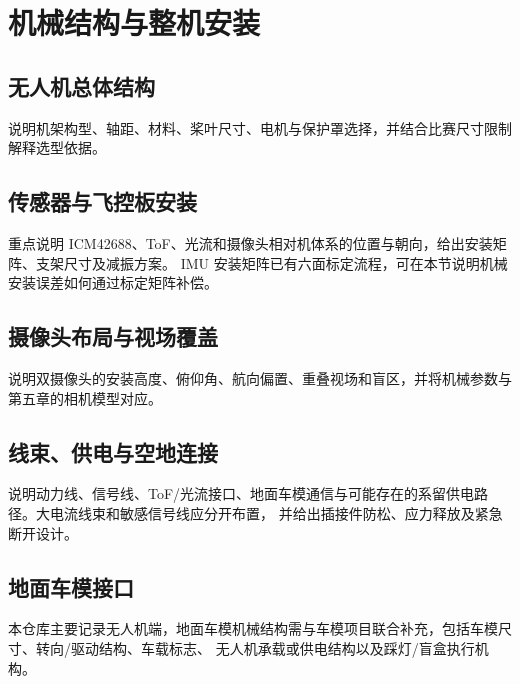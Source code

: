 \chapter{机械结构与整机安装}

\section{无人机总体结构}

说明机架构型、轴距、材料、桨叶尺寸、电机与保护罩选择，并结合比赛尺寸限制解释选型依据。



\section{传感器与飞控板安装}

重点说明 ICM42688、ToF、光流和摄像头相对机体系的位置与朝向，给出安装矩阵、支架尺寸及减振方案。
IMU 安装矩阵已有六面标定流程，可在本节说明机械安装误差如何通过标定矩阵补偿。


\section{摄像头布局与视场覆盖}

说明双摄像头的安装高度、俯仰角、航向偏置、重叠视场和盲区，并将机械参数与第五章的相机模型对应。


\section{线束、供电与空地连接}

说明动力线、信号线、ToF/光流接口、地面车模通信与可能存在的系留供电路径。大电流线束和敏感信号线应分开布置，
并给出插接件防松、应力释放及紧急断开设计。

\section{地面车模接口}

本仓库主要记录无人机端，地面车模机械结构需与车模项目联合补充，包括车模尺寸、转向/驱动结构、车载标志、
无人机承载或供电结构以及踩灯/盲盒执行机构。

